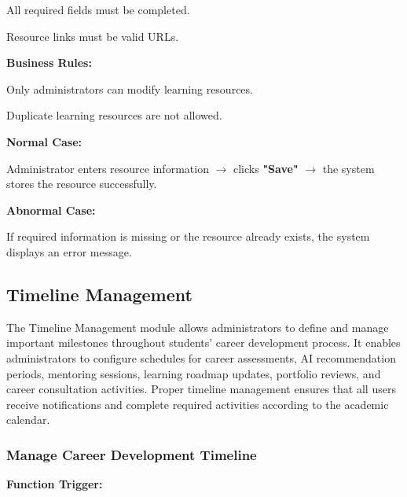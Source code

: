 All required fields must be completed.

Resource links must be valid URLs.

\textbf{Business Rules:}

Only administrators can modify learning resources.

Duplicate learning resources are not allowed.

\textbf{Normal Case:}

Administrator enters resource information $\rightarrow$ clicks \textbf{"Save"} $\rightarrow$ the system stores the resource successfully.

\textbf{Abnormal Case:}

If required information is missing or the resource already exists, the system displays an error message.

%

\subsection{Timeline Management}

The Timeline Management module allows administrators to define and manage important milestones throughout students' career development process. It enables administrators to configure schedules for career assessments, AI recommendation periods, mentoring sessions, learning roadmap updates, portfolio reviews, and career consultation activities. Proper timeline management ensures that all users receive notifications and complete required activities according to the academic calendar.

\subsubsection{Manage Career Development Timeline}

\textbf{Function Trigger:}

